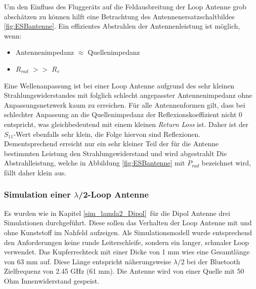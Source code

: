 Um den Einfluss des Fluggeräts auf die Feldausbreitung der Loop Antenne grob abschätzen zu können hilft eine Betrachtung des Antennenersatzschaltbildes \ref{fig:ESBantenne}. Ein effizientes Abstrahlen der Antennenleistung ist möglich, wenn:
 \begin{itemize}
 \item Antennenimpedanz $\approx$ Quellenimpedanz
 \item $R_{rad}$ $>>$ $R_{v}$ 
 \end{itemize}
Eine Wellenanpassung ist bei einer Loop Antenne aufgrund des sehr kleinen Strahlungswiderstandes mit folglich schlecht angepasster Antennenimpedanz ohne Anpassungsnetzwerk kaum zu erreichen. Für alle Antennenformen gilt, dass bei schlechter Anpassung an die Quellenimpedanz der Reflexionskoeffizient nicht 0 entspricht, was gleichbedeutend  mit einem kleinen \textit{Return Loss} ist. Daher ist der $S_{11}$-Wert ebenfalls sehr klein, die Folge hiervon sind Reflexionen. 
Dementsprechend erreicht nur ein sehr kleiner Teil der für die Antenne bestimmten Leistung den Strahlungswiderstand und wird abgestrahlt Die Abstrahlleistung, welche in Abbildung \ref{fig:ESBantenne} mit $P_{rad}$ bezeichnet wird, fällt daher klein aus.

\subsubsection{Simulation einer $\lambda$/2-Loop Antenne}\label{sec:SimL2Loop}
Es wurden wie in Kapitel \ref{sim_lamda2_Dipol}\ für die Dipol Antenne drei Simulationen durchgeführt. Diese sollen das Verhalten der Loop Antenne mit und ohne Kunststoff im Nahfeld aufzeigen. Als Simulationsmodell wurde entsprechend den Anforderungen keine runde Leiterschleife, sondern ein langer, schmaler Loop verwendet. Das Kupferrechteck mit einer Dicke von 1 mm wies eine Gesamtlänge von 63 mm auf. Diese Länge entspricht näherungsweise $\lambda/2$ bei der Bluetooth Zielfrequenz von 2.45 GHz (61 mm). Die Antenne wird von einer Quelle mit 50 Ohm Innenwiderstand gespeist. \\

